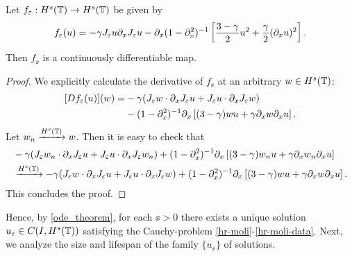 %
%
%
\begin{lemma}
Let $f_\varepsilon:H^s(\mathbb{T}) \to H^s(\mathbb{T})$ be given by 
\begin{equation}
\label{f_ep}
f_{\varepsilon}(u) = -\gamma  J_\varepsilon u \partial_x J_\varepsilon u
- \partial_x (1-\partial_x^2)^{-1} \left
[\frac{3-\gamma}{2}u^2 + \frac{\gamma}{2}(\partial_x u)^2 \right ].
\end{equation}
Then $f_\ee$  is a continuously differentiable map.
\end{lemma}
%
%
\begin{proof} We explicitly calculate the derivative of $f_\ee$ at an
arbitrary $w \in H^s(\mathbb{T})$:
\begin{equation*}
\begin{split}
[Df_{\varepsilon}(u)](w)
=
& -\gamma (J_\varepsilon w \cdot \partial_x J_\varepsilon u +
J_\varepsilon u \cdot \partial_x J_\varepsilon w)
\\
& - (1-\partial_x ^2)^{-1}
\partial_x \left [(3-\gamma)w u + \gamma\partial_x w \partial_x u \right ].
\end{split}
\end{equation*}
Let $w_n \xrightarrow{H^s(\mathbb{T})} w$. Then it is easy to check that
%
\begin{equation}
\begin{split}
& -\gamma (J_\varepsilon w_n \cdot \partial_x J_\varepsilon u 
+ J_\varepsilon u \cdot \partial_x J_\varepsilon w_n)
+ (1-\partial_x ^2)^{-1}
\partial_x \left [(3-\gamma)w_n u + \gamma\partial_x w_n \partial_x u \right ]
\\
& \xrightarrow{H^s(\mathbb{T})} 
-\gamma (J_\varepsilon w \cdot \partial_x J_\varepsilon u 
+ J_\varepsilon u \cdot \partial_x J_\varepsilon w) + (1-\partial_x ^2)^{-1}
\partial_x \left [(3-\gamma)w u + \gamma\partial_x w \partial_x u \right ].
\end{split}
\end{equation}
This concludes the proof. 
\end{proof}
Hence, by \cref{ode_theorem}, for each $\ee > 0$ there exists a
unique solution $u_\varepsilon \in C(I, H^s(\mathbb{T}))$ satisfying the Cauchy-problem
\eqref{hr-moli}-\eqref{hr-moli-data}. Next, we analyze the size and
lifespan of the family $\{u_\ee\}$ of solutions.
%
%
%
%
